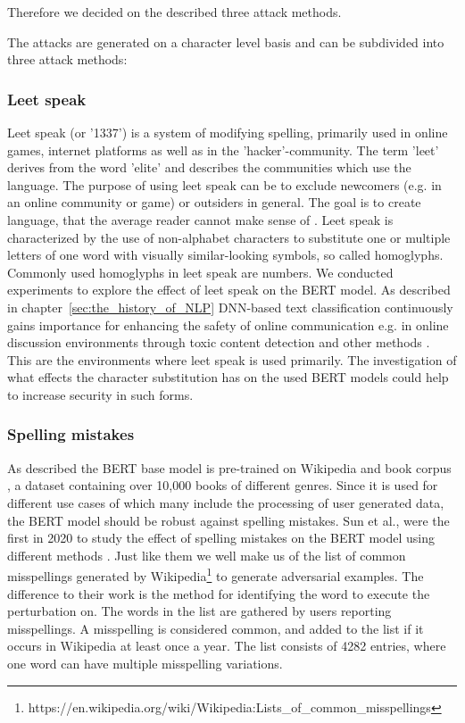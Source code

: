 Therefore we decided on the described three attack methods. 


The attacks are generated on a character level basis and can be subdivided into three attack methods:

\subsubsection{Leet speak}
Leet speak (or '1337') is a system of modifying spelling, primarily used in online games, internet platforms as well as in the 'hacker'-community. The term 'leet' derives from the word 'elite' and describes the communities which use the language. The purpose of using leet speak can be to exclude newcomers (e.g. in an online community or game) or outsiders in general. The goal is to create language, that the average reader cannot make sense of \cite{thomas2002hacker}.   
Leet speak is characterized by the use of non-alphabet characters to substitute one or multiple letters of one word with visually similar-looking symbols, so called homoglyphs. Commonly used homoglyphs in leet speak are numbers. 
We conducted experiments to explore the effect of leet speak on the BERT model. As described in chapter~\ref{sec:the_history_of_NLP} DNN-based text classification continuously gains importance for enhancing the safety of online communication e.g. in online discussion environments through toxic content detection and other methods \cite{kumar2011natural}. This are the environments where leet speak is used primarily. The investigation of what effects the character substitution has on the used BERT models could help to increase security in such forms. 

\subsubsection{Spelling mistakes}
As described the BERT base model is pre-trained on Wikipedia and book corpus \cite{zhu2015aligning}, a dataset containing over 10,000 books of different genres. Since it is used for different use cases of which many include the processing of user generated data, the BERT model should be robust against spelling mistakes. Sun et al., were the first in 2020 to study the effect of spelling mistakes on the BERT model  using different methods \cite{sun2020adv}. Just like them we well make us of the list of common misspellings generated by Wikipedia\footnote{https://en.wikipedia.org/wiki/Wikipedia:Lists_of_common_misspellings} to generate adversarial examples. The difference to their work is the method for identifying the word to execute the perturbation on. 
The words in the list are gathered by users reporting misspellings. A misspelling is considered common, and added to the list if it occurs in Wikipedia at least once a year.
The list consists of 4282 entries, where one word can have multiple misspelling variations. 

